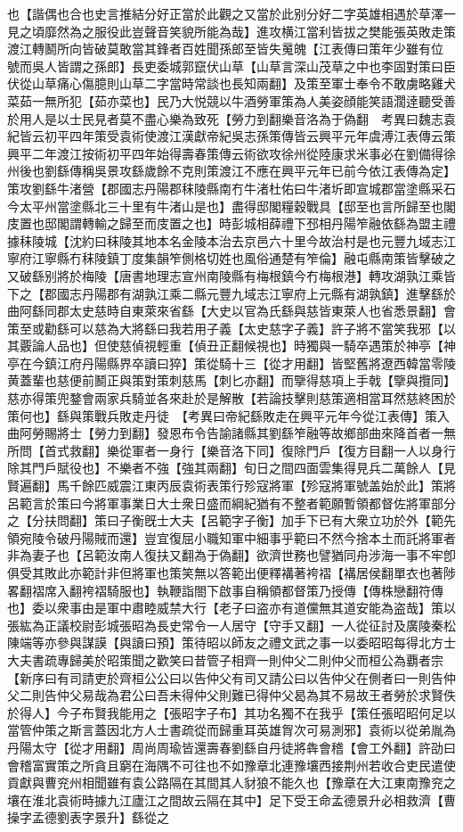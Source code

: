 也【諧偶也合也史言推結分好正當於此觀之又當於此别分好二字英雄相遇於草澤一見之頃靡然為之服役此豈聲音笑貌所能為哉】進攻横江當利皆拔之樊能張英敗走策渡江轉鬭所向皆破莫敢當其鋒者百姓聞孫郎至皆失䰟魄【江表傳曰策年少雖有位　號而吳人皆謂之孫郎】長吏委城郭竄伏山草【山草言深山茂草之中也李固對策曰臣伏從山草痛心傷臆則山草二字當時常談也長知兩翻】及策至軍士奉令不敢虜略雞犬菜茹一無所犯【茹亦菜也】民乃大悦競以牛酒勞軍策為人美姿顔能笑語濶逹聽受善於用人是以士民見者莫不盡心樂為致死【勞力到翻樂音洛為于偽翻　考異曰魏志袁紀皆云初平四年策受袁術使渡江漢獻帝紀吳志孫策傳皆云興平元年虞溥江表傳云策興平二年渡江按術初平四年始得壽春策傳云術欲攻徐州從陸康求米事必在劉備得徐州後也劉繇傳稱吳景攻繇歲餘不克則策渡江不應在興平元年已前今依江表傳為定】策攻劉繇牛渚營【郡國志丹陽郡秣陵縣南冇牛渚杜佑曰牛渚圻即宣城郡當塗縣采石今太平州當塗縣北三十里有牛渚山是也】盡得邸閣糧穀戰具【邸至也言所歸至也閣庋置也邸閣謂轉輸之歸至而庋置之也】時彭城相薛禮下邳相丹陽笮融依繇為盟主禮據秣陵城【沈約曰秣陵其地本名金陵本治去京邑六十里今故治村是也元豐九域志江寧府江寧縣冇秣陵鎮丁度集韻笮側格切姓也風俗通楚有笮倫】融屯縣南策皆擊破之又破繇别將於梅陵【唐書地理志宣州南陵縣有梅根鎮今冇梅根港】轉攻湖孰江乘皆下之【郡國志丹陽郡有湖孰江乘二縣元豐九域志江寧府上元縣有湖孰鎮】進擊繇於曲阿繇同郡太史慈時自東萊來省繇【大史以官為氏繇與慈皆東萊人也省悉景翻】會策至或勸繇可以慈為大將繇曰我若用子義【太史慈字子義】許子將不當笑我邪【以其覈論人品也】但使慈偵視輕重【偵丑正翻候視也】時獨與一騎卒遇策於神亭【神亭在今鎮江府丹陽縣界卒讀曰猝】策從騎十三【從才用翻】皆堅舊將遼西韓當零陵黄蓋輩也慈便前鬭正與策對策刺慈馬【刺匕亦翻】而擥得慈項上手戟【擥與攬同】慈亦得策兜鍪會兩家兵騎並各來赴於是解散【若論技擊則慈策適相當耳然慈終困於策何也】繇與策戰兵敗走丹徒　【考異曰帝紀繇敗走在興平元年今從江表傳】策入曲阿勞賜將士【勞力到翻】發恩布令告諭諸縣其劉繇笮融等故鄉部曲來降首者一無所問【首式救翻】樂從軍者一身行【樂音洛下同】復除門戶【復方目翻一人以身行除其門戶賦役也】不樂者不強【強其兩翻】旬日之間四面雲集得見兵二萬餘人【見賢遍翻】馬千餘匹威震江東丙辰袁術表策行殄寇將軍【殄寇將軍號盖始於此】策將呂範言於策曰今將軍事業日大士衆日盛而綱紀猶有不整者範願暫領都督佐將軍部分之【分扶問翻】策曰子衡旣士大夫【呂範字子衡】加手下已有大衆立功於外【範先領宛陵令破丹陽賊而還】豈宜復屈小職知軍中細事乎範曰不然今捨本土而託將軍者非為妻子也【呂範汝南人復扶又翻為于偽翻】欲濟世務也譬猶同舟涉海一事不牢卽俱受其敗此亦範計非但將軍也策笑無以答範出便釋褠著袴褶【褠居侯翻單衣也著陟畧翻褶席入翻袴褶騎服也】執鞭詣閤下啟事自稱領都督策乃授傳【傳株戀翻符傳也】委以衆事由是軍中肅睦威禁大行【老子曰盗亦有道儻無其道安能為盗哉】策以張紘為正議校尉彭城張昭為長史常令一人居守【守手又翻】一人從征討及廣陵秦松陳端等亦參與謀謨【與讀曰預】策待昭以師友之禮文武之事一以委昭昭每得北方士大夫書疏專歸美於昭策聞之歡笑曰昔管子相齊一則仲父二則仲父而桓公為覇者宗【新序曰有司請吏於齊桓公公曰以告仲父有司又請公曰以告仲父在側者曰一則告仲父二則告仲父易哉為君公曰吾未得仲父則難已得仲父曷為其不易故王者勞於求賢佚於得人】今子布賢我能用之【張昭字子布】其功名獨不在我乎【策任張昭昭何足以當管仲策之斯言蓋因北方人士書疏從而歸重耳英雄胷次可易測邪】袁術以從弟胤為丹陽太守【從才用翻】周尚周瑜皆還壽春劉繇自丹徒將犇會稽【會工外翻】許劭曰會稽富實策之所貪且窮在海隅不可往也不如豫章北連豫壤西接荆州若收合吏民遣使貢獻與曹兖州相聞雖有袁公路隔在其間其人豺狼不能久也【豫章在大江東南豫兖之壤在淮北袁術時據九江廬江之間故云隔在其中】足下受王命孟德景升必相救濟【曹操字孟德劉表字景升】繇從之　